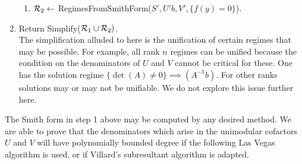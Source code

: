 \begin{enumerate}
\begin{enumerate}
\item
${\cal R}_2 \leftarrow$ RegimesFromSmithForm($S', U'b, V', \{f(y) = 0\}$).
\end{enumerate}
\item
Return Simplify(${\cal R}_1 \cup {\cal R}_2)$.\\
\bc
The simplification alluded to here is the unification of certain regimes that
may be possible.  For example, all rank $n$ regimes can be unified because 
the condition on the denominators of $U$ and $V$ cannot be critical for these.
One has the solution regime $\{\det(A) \neq 0\}\implies (A^{-1}b)$.  For other 
ranks solutions may or may not be unifiable.  We do not explore this issue 
further here. \ec
\end{enumerate}

\newpage
The Smith form in step 1 above may be computed by any desired method.  We are able to 
prove that the denominators which arise in the unimodular cofactors $U$ and $V$ will
have polynomially bounded degree if the following Las Vegas algorithm is used, or if 
Villard's subresultant algorithm \cite{Vil,Lab} is adapted.

